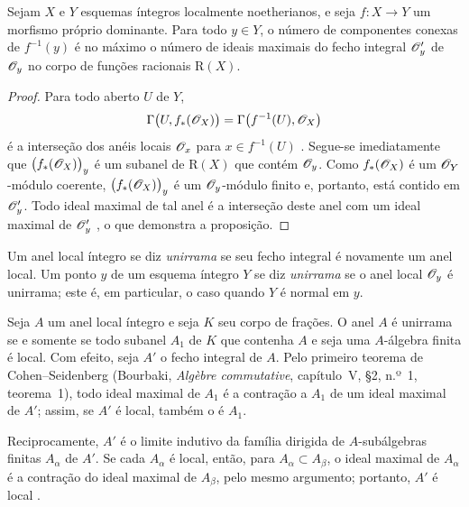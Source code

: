 \begin{proposition}[4.3.5]
\label{III.4.3.5}
Sejam $X$ e $Y$ esquemas íntegros localmente noetherianos, e seja
$f:X\to Y$ um morfismo próprio dominante. Para todo $y\in Y$, o
número de componentes conexas de $f^{-1}(y)$ é no máximo o número
de ideais maximais do fecho integral $\mathscr{O}'_y$ de
$\mathscr{O}_y$ no corpo de funções racionais $\mathrm{R}(X)$.
\end{proposition}

\begin{proof}
Para todo aberto $U$ de $Y$,
\[
  \Gamma\bigl(U,f_*(\mathscr{O}_X)\bigr)
  =
  \Gamma\bigl(f^{-1}(U),\mathscr{O}_X\bigr)
\]
é a interseção dos anéis locais $\mathscr{O}_x$ para
$x\in f^{-1}(U)$ . Segue-se imediatamente que
$\bigl(f_*(\mathscr{O}_X)\bigr)_y$ é um subanel de $\mathrm{R}(X)$ que
contém $\mathscr{O}_y$. Como $f_*(\mathscr{O}_X)$ é um
$\mathscr{O}_Y$-módulo coerente, $\bigl(f_*(\mathscr{O}_X)\bigr)_y$ é um
$\mathscr{O}_y$-módulo finito e, portanto, está contido em $\mathscr{O}'_y$.
Todo ideal maximal de tal anel é a interseção deste anel com
um ideal maximal de $\mathscr{O}'_y$
\cite[vol.~I, pp.~257 and 259]{I-13}, o que demonstra a proposição.
\end{proof}

\begin{definition}[4.3.6]
\label{III.4.3.6}
Um anel local íntegro se diz \emph{unirrama} se seu fecho integral
é novamente um anel local. Um ponto $y$ de um esquema íntegro
$Y$ se diz \emph{unirrama} se o anel local $\mathscr{O}_y$ é
unirrama; este é, em particular, o caso quando $Y$ é normal em
$y$.
\end{definition}

Seja $A$ um anel local íntegro e seja $K$ seu corpo de frações. O
anel $A$ é unirrama se e somente se todo subanel $A_1$ de $K$ que
contenha $A$ e seja uma $A$-álgebra finita é local. Com efeito, seja
$A'$ o fecho integral de $A$. Pelo primeiro teorema de
Cohen--Seidenberg (Bourbaki, \emph{Alg\`ebre commutative}, capítulo~V,
\S2, n.º~1, teorema~1), todo ideal maximal de $A_1$ é a contração
a $A_1$ de um ideal maximal de $A'$; assim, se $A'$ é local, também
o é $A_1$.


Reciprocamente, $A'$ é o limite indutivo da família dirigida de
$A$-subálgebras finitas $A_\alpha$ de $A'$. Se cada $A_\alpha$ é
local, então, para $A_\alpha\subset A_\beta$, o ideal maximal de
$A_\alpha$ é a contração do ideal maximal de $A_\beta$, pelo
mesmo argumento; portanto, $A'$ é local
.


